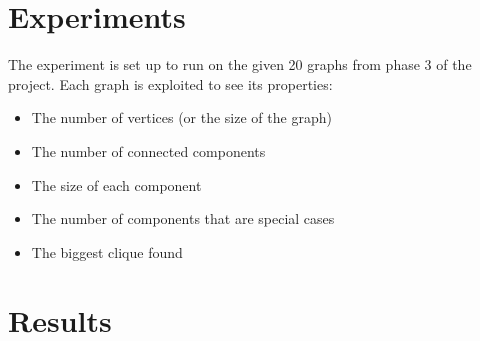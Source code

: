 \documentclass[a4paper]{report}
\begin{document}
		
		
	\chapter{Experiments}
	The experiment is set up to run on the given 20 graphs from phase 3 of the project. Each graph is exploited to see its properties:
	\begin{itemize}
		\item The number of vertices (or the size of the graph)
		\item The number of connected components
		\item The size of each component
		\item The number of components that are special cases
		\item The biggest clique found
	\end{itemize}

	\chapter{Results}
\end{document}
